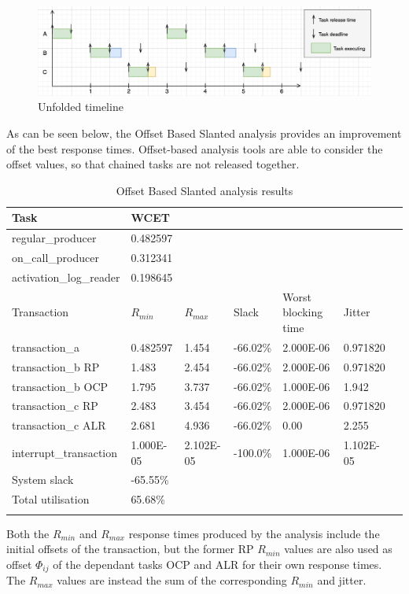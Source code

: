 \documentclass{article}
\begin{document}
\begin{figure}[!htbp]
\centering
\includegraphics[width=6.5in]{images/timeline-offsets}
\caption{Unfolded timeline}
\label{timeline-offsets}
\end{figure}

As can be seen below, the Offset Based Slanted analysis provides an improvement of the best response times. Offset-based analysis tools are able to consider the offset values, so that chained tasks are not released together.

\begin{longtable}{lllllll}
   \toprule
   Task & WCET \\
   \midrule
   regular\_producer & 0.482597 \\
   on\_call\_producer & 0.312341 \\
   activation\_log\_reader & 0.198645 \\
   \toprule
   \toprule
   Transaction & $R_{min}$ & $R_{max}$ & Slack & Worst blocking time & Jitter \\
   \midrule
   transaction\_a & 0.482597 & 1.454 & -66.02\% &  2.000E-06 & 0.971820 \\
   transaction\_b RP & 1.483 & 2.454 & -66.02\% & 2.000E-06 & 0.971820 \\
   transaction\_b OCP & 1.795 & 3.737 & -66.02\% & 1.000E-06 & 1.942 \\
   transaction\_c RP & 2.483 & 3.454 & -66.02\% & 2.000E-06 & 0.971820 \\
   transaction\_c ALR & 2.681 & 4.936 & -66.02\% & 0.00 & 2.255 \\
   interrupt\_transaction & 1.000E-05 & 2.102E-05 & -100.0\% & 1.000E-06 & 1.102E-05 \\
   \toprule
   \toprule
   System slack & -65.55\% \\
   Total utilisation & 65.68\% \\
   \bottomrule
   \caption{Offset Based Slanted analysis results}
\label{tab:rm-fps-24-ocp-44-alr-56}
\end{longtable}

Both the $R_{min}$ and $R_{max}$ response times produced by the analysis include the initial offsets of the transaction, but the former RP $R_{min}$ values are also used as offset $\Phi_{ij}$ of the dependant tasks OCP and ALR for their own response times. The $R_{max}$ values are instead the sum of the corresponding $R_{min}$ and jitter.
\end{document}
